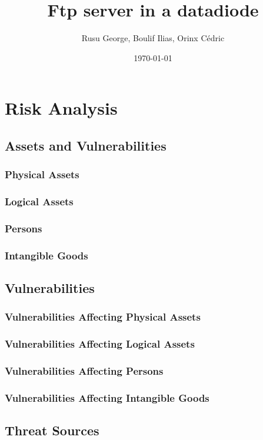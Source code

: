 \documentclass[a4paper,10pt]{article}
\title{Ftp server in a datadiode}
\author{Rusu George, Boulif Ilias, Orinx Cédric}
\date{\today}
\begin{document}
\maketitle

\newpage
\section{Risk Analysis}
\subsection{Assets and Vulnerabilities}
\subsubsection{Physical Assets}
\subsubsection{Logical Assets}
\subsubsection{Persons}
\subsubsection{Intangible Goods}

\subsection{Vulnerabilities}
\subsubsection{Vulnerabilities Affecting Physical Assets}
\subsubsection{Vulnerabilities Affecting Logical Assets}
\subsubsection{Vulnerabilities Affecting Persons}
\subsubsection{Vulnerabilities Affecting Intangible Goods}

\subsection{Threat Sources}
\end{document}
